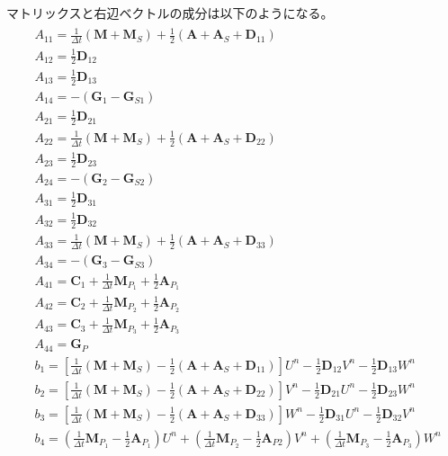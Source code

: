 マトリックスと右辺ベクトルの成分は以下のようになる。
\begin{equation}
	\begin{gathered}
		\begin{aligned} 
			&A_{11} = \frac{1}{\Delta t}\left(\bm{M}+\bm{M}_S\right)+\frac{1}{2}\left(\bm{A}+\bm{A}_S+\bm{D}_{11}\right) \\ 
			&A_{12} = \frac{1}{2} \bm{D}_{12} \\ 
			&A_{13} = \frac{1}{2} \bm{D}_{13} \\
			&A_{14} = -\left(\bm{G}_1-\bm{G}_{S 1}\right) \\
			&A_{21} = \frac{1}{2} \bm{D}_{21} \\ 
			&A_{22} = \frac{1}{\Delta t}\left(\bm{M}+\bm{M}_S\right)+\frac{1}{2}\left(\bm{A}+\bm{A}_S+\bm{D}_{22}\right) \\
			&A_{23} = \frac{1}{2} \bm{D}_{23} \\ 
			&A_{24} = -\left(\bm{G}_2-\bm{G}_{S 2}\right) \\
			&A_{31} = \frac{1}{2} \bm{D}_{31} \\
			&A_{32} = \frac{1}{2} \bm{D}_{32} \\
			&A_{33} = \frac{1}{\Delta t}\left(\bm{M}+\bm{M}_S\right)+\frac{1}{2}\left(\bm{A}+\bm{A}_S+\bm{D}_{33}\right) \\
			&A_{34} = -\left(\bm{G}_3-\bm{G}_{S 3}\right) \\
			&A_{41} = \bm{C}_1+\frac{1}{\Delta t} \bm{M}_{P_1}+\frac{1}{2} \bm{A}_{P_1} \\ 
			&A_{42} = \bm{C}_2+\frac{1}{\Delta t} \bm{M}_{P_2}+\frac{1}{2} \bm{A}_{P_2} \\ 
			&A_{43} = \bm{C}_3+\frac{1}{\Delta t} \bm{M}_{P_3}+\frac{1}{2} \bm{A}_{P_3} \\ 
			&A_{44} = \bm{G}_P \\ 
			&b_1 = \left[\frac{1}{\Delta t}\left(\bm{M}+\bm{M}_S\right)-\frac{1}{2}\left(\bm{A}+\bm{A}_S+\bm{D}_{11}\right)\right] U^n - \frac{1}{2} \bm{D}_{12} V^n - \frac{1}{2} \bm{D}_{13} W^n\\
			&b_2 = \left[\frac{1}{\Delta t}\left(\bm{M}+\bm{M}_S\right)-\frac{1}{2}\left(\bm{A}+\bm{A}_S+\bm{D}_{22}\right)\right] V^n - \frac{1}{2} \bm{D}_{21} U^n - \frac{1}{2} \bm{D}_{23} W^n\\ 
			&b_3 = \left[\frac{1}{\Delta t}\left(\bm{M}+\bm{M}_S\right)-\frac{1}{2}\left(\bm{A}+\bm{A}_S+\bm{D}_{33}\right)\right] W^n - \frac{1}{2} \bm{D}_{31} U^n - \frac{1}{2} \bm{D}_{32} V^n\\ 
			&b_4 = \left(\frac{1}{\Delta t} \bm{M}_{P_1} - \frac{1}{2} \bm{A}_{P_1}\right) U^n
			      +\left(\frac{1}{\Delta t} \bm{M}_{P_2} - \frac{1}{2} \bm{A}_{P 2}\right) V^n
			      +\left(\frac{1}{\Delta t} \bm{M}_{P_3} - \frac{1}{2} \bm{A}_{P_3}\right) W^n
		\end{aligned}
	\end{gathered}
\end{equation}

